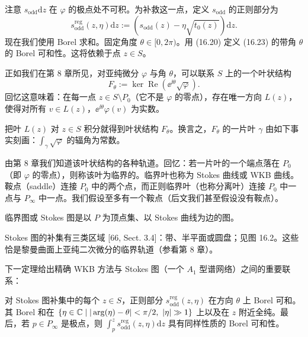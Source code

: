 
注意 $s_{\mathrm{odd}}\mathrm{d}z$ 在 $\varphi$ 的极点处不可积。为补救这一点，定义 $s_{\mathrm{odd}}$ 的正则部分为
\[
s^{\mathrm{reg}}_{\mathrm{odd}}(z,\eta)\mathrm{d}z:=\left(s_{\mathrm{odd}}(z)-\eta\sqrt{t_0(z)}\right)\mathrm{d}z.
\]
现在我们使用 Borel 求和。固定角度 $\theta\in[0,2\pi)$。用 (16.20) 定义 (16.23) 的带角 $\theta$ 的 Borel 可和性。这将依赖于点 $z\in S$。

正如我们在第 8 章所见，对亚纯微分 $\varphi$ 与角 $\theta$，可以联系 $S$ 上的一个叶状结构
\[
F_\theta:=\ker\operatorname{Re}\left(\ee^{\ii\theta}\sqrt{\varphi}\right).
\]
回忆这意味着：在每一点 $z\in S\setminus P_0$（它不是 $\varphi$ 的零点），存在唯一方向 $L(z)$，使得对所有 $v\in L(z)$，$\ee^{\ii\theta}\varphi(v)$ 为实数。

把叶 $L(z)$ 对 $z\in S$ 积分就得到叶状结构 $F_\theta$。换言之，$F_\theta$ 的一片叶 $\gamma$ 由如下事实刻画：$\int_\gamma\sqrt{\varphi}$ 的辐角为常数。

由第 8 章我们知道该叶状结构的各种轨道。回忆：若一片叶的一个端点落在 $P_0$（即 $\varphi$ 的零点），则称该叶为临界的。临界叶也称为 Stokes 曲线或 WKB 曲线。鞍点（saddle）连接 $P_0$ 中的两个点，而正则临界叶（也称分离叶）连接 $P_0$ 中一点与 $P_\infty$ 中一点。我们假设至多有一个鞍点（后文我们甚至假设没有鞍点）。

临界图或 Stokes 图是以 $P$ 为顶点集、以 Stokes 曲线为边的图。

Stokes 图的补集有三类区域 [66, Sect. 3.4]：带、半平面或圆盘；见图 16.2。这些恰是黎曼曲面上亚纯二次微分的临界轨道（参看第 8 章）。


下一定理给出精确 WKB 方法与 Stokes 图（一个 $A_1$ 型谱网络）之间的重要联系：

\begin{theorem} 对 Stokes 图补集中的每个 $z\in S$，正则部分 $s^{\mathrm{reg}}_{\mathrm{odd}}(z,\eta)$ 在方向 $\theta$ 上 Borel 可和。其 Borel 和在 $\{\eta\in\C\mid|\arg(\eta)-\theta|<\pi/2,\ |\eta|\gg1\}$ 上以及在 $z$ 附近全纯。最后，若 $p\in P_\infty$ 是极点，则 $\int_p^z s^{\mathrm{reg}}_{\mathrm{odd}}(z,\eta)\mathrm{d}z$ 具有同样性质的 Borel 可和性。\end{theorem}

